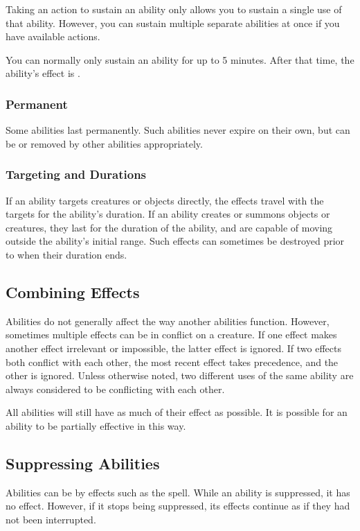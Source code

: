             Taking an action to sustain an ability only allows you to sustain a single use of that ability.
            However, you can sustain multiple separate abilities at once if you have available actions.

            You can normally only sustain an ability for up to 5 minutes.
            After that time, the ability's effect is .

        \subsubsection{Permanent}
            Some abilities last permanently.
            Such abilities never expire on their own, but can be  or removed by other abilities appropriately.

        \subsubsection{Targeting and Durations}
            If an ability targets creatures or objects directly, the effects travel with the targets for the ability's duration.
            If an ability creates or summons objects or creatures, they last for the duration of the ability, and are capable of moving outside the ability's initial range.
            Such effects can sometimes be destroyed prior to when their duration ends.

    \subsection{Combining Effects}
        Abilities do not generally affect the way another abilities function.
        However, sometimes multiple effects can be in conflict on a creature.
        If one effect makes another effect irrelevant or impossible, the latter effect is ignored.
        If two effects both conflict with each other, the most recent effect takes precedence, and the other is ignored.
        Unless otherwise noted, two different uses of the same ability are always considered to be conflicting with each other.

        All abilities will still have as much of their effect as possible.
        It is possible for an ability to be partially effective in this way.

    \subsection{Suppressing Abilities}\label{Suppressing Abilities}
        Abilities can be  by effects such as the  spell.
        While an ability is suppressed, it has no effect.
        However, if it stops being suppressed, its effects continue as if they had not been interrupted.

